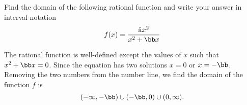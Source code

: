 







Find the domain of the following rational function and write your answer in interval notation
\[
  f(x)=\frac{\aa x^2}{x^2+\bb x}
\]

\begin{solution}
The rational function is well-defined except the values of $x$ such that $x^2+\bb x= 0$. Since the equation has two solutions $x=0$ or $x=-\bb$. Removing the two numbers from the number line, we find the domain of the function $f$ is 
\[(-\infty, -\bb)\cup (-\bb, 0)\cup(0, \infty).\]
\end{solution}